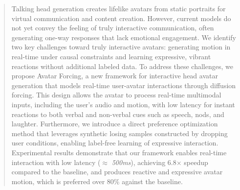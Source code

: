 \begin{abstract}
Talking head generation creates lifelike avatars from static portraits for virtual communication and content creation.
However, current models do not yet convey the feeling of truly interactive communication, often generating one-way responses that lack emotional engagement. We identify two key challenges toward truly interactive avatars: generating motion in real-time under causal constraints and learning expressive, vibrant reactions without additional labeled data.
To address these challenges, we propose Avatar Forcing, a new framework for interactive head avatar generation that models real-time user-avatar interactions through diffusion forcing. This design allows the avatar to process real-time multimodal inputs, including the user’s audio and motion, with low latency for instant reactions to both verbal and non-verbal cues such as speech, nods, and laughter. Furthermore, we introduce a direct preference optimization method that leverages synthetic losing samples constructed by dropping user conditions, enabling label-free learning of expressive interaction. Experimental results demonstrate that our framework enables real-time interaction with low latency ($\approx$ \textit{500ms}), achieving 6.8$\times$ speedup compared to the baseline, and produces reactive and expressive avatar motion, which is preferred over 80\% against the baseline.
\end{abstract}